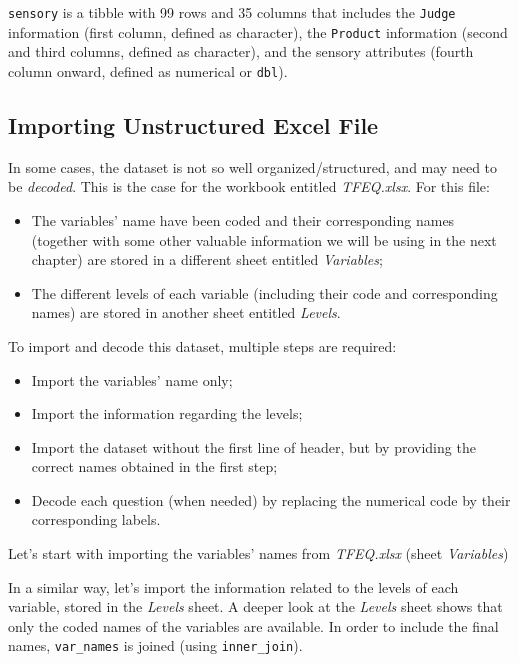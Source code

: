 \documentclass[
]{book}
\providecommand{\tightlist}{%
  \setlength{\itemsep}{0pt}\setlength{\parskip}{0pt}}
\begin{document}
\texttt{sensory} is a tibble with 99 rows and 35 columns that includes the \texttt{Judge} information (first column, defined as character), the \texttt{Product} information (second and third columns, defined as character), and the sensory attributes (fourth column onward, defined as numerical or \texttt{dbl}).

\hypertarget{importing-unstructured-excel-file}{%
\subsection{Importing Unstructured Excel File}\label{importing-unstructured-excel-file}}

In some cases, the dataset is not so well organized/structured, and may need to be \emph{decoded}. This is the case for the workbook entitled \emph{TFEQ.xlsx}. For this file:

\begin{itemize}
\tightlist
\item
  The variables' name have been coded and their corresponding names (together with some other valuable information we will be using in the next chapter) are stored in a different sheet entitled \emph{Variables};
\item
  The different levels of each variable (including their code and corresponding names) are stored in another sheet entitled \emph{Levels}.
\end{itemize}

To import and decode this dataset, multiple steps are required:

\begin{itemize}
\tightlist
\item
  Import the variables' name only;
\item
  Import the information regarding the levels;
\item
  Import the dataset without the first line of header, but by providing the correct names obtained in the first step;
\item
  Decode each question (when needed) by replacing the numerical code by their corresponding labels.
\end{itemize}

Let's start with importing the variables' names from \emph{TFEQ.xlsx} (sheet \emph{Variables})

In a similar way, let's import the information related to the levels of each variable, stored in the \emph{Levels} sheet.
A deeper look at the \emph{Levels} sheet shows that only the coded names of the variables are available. In order to include the final names, \texttt{var\_names} is joined (using \texttt{inner\_join}).
\end{document}
